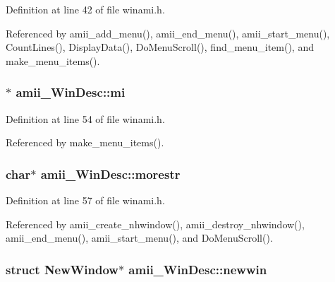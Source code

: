 Definition at line 42 of file winami.\+h.



Referenced by amii\+\_\+add\+\_\+menu(), amii\+\_\+end\+\_\+menu(), amii\+\_\+start\+\_\+menu(), Count\+Lines(), Display\+Data(), Do\+Menu\+Scroll(), find\+\_\+menu\+\_\+item(), and make\+\_\+menu\+\_\+items().

\hypertarget{structamii__WinDesc_a9560c1afff5afb6c363fd74aa25283df}{
\subsubsection[{mi}]{$\ast$ amii\+\_\+\+Win\+Desc\+::mi}}\label{structamii__WinDesc_a9560c1afff5afb6c363fd74aa25283df}


Definition at line 54 of file winami.\+h.



Referenced by make\+\_\+menu\+\_\+items().

\hypertarget{structamii__WinDesc_a18f1ba88dadd6f00144ad9f0b16a2b20}{
\subsubsection[{morestr}]{\setlength{\rightskip}{0pt plus 5cm}char$\ast$ amii\+\_\+\+Win\+Desc\+::morestr}}\label{structamii__WinDesc_a18f1ba88dadd6f00144ad9f0b16a2b20}


Definition at line 57 of file winami.\+h.



Referenced by amii\+\_\+create\+\_\+nhwindow(), amii\+\_\+destroy\+\_\+nhwindow(), amii\+\_\+end\+\_\+menu(), amii\+\_\+start\+\_\+menu(), and Do\+Menu\+Scroll().

\hypertarget{structamii__WinDesc_a96e2d1e26527cec8fe44903009a365a8}{
\subsubsection[{newwin}]{\setlength{\rightskip}{0pt plus 5cm}struct New\+Window$\ast$ amii\+\_\+\+Win\+Desc\+::newwin}}\label{structamii__WinDesc_a96e2d1e26527cec8fe44903009a365a8}


